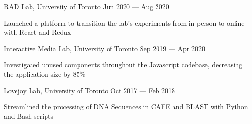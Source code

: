 \begin{cventries}
  \cventry
    {}
    {RAD Lab, University of Toronto}
    {}
    {Jun 2020 --- Aug 2020}
    {}
    {
      \begin{cvitems}
        \item {Launched a platform to transition the lab's experiments from in-person to online with React and Redux}
      \end{cvitems}
    }
  \cventry
    {}
    {Interactive Media Lab, University of Toronto}
    {}
    {Sep 2019 --- Apr 2020}
    {}
    {
      \begin{cvitems}
        \item {Investigated unused components throughout the Javascript codebase, decreasing the application size by 85\% }
      \end{cvitems}
    }
  \cventry
    {}
    {Lovejoy Lab, University of Toronto}
    {}
    {Oct 2017 --- Feb 2018}
    {}
    {
      \begin{cvitems}
        \item {Streamlined the processing of DNA Sequences in CAFE and BLAST with Python and Bash scripts}
      \end{cvitems}
    }
\end{cventries}